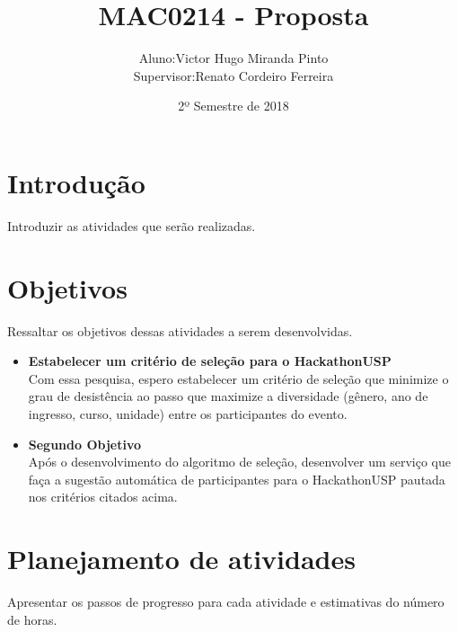\documentclass[10pt,twoside,a4paper]{article}
\title{MAC0214 - Proposta}
\author{
  \begin{tabular}{rl}
    Aluno:      & Victor Hugo Miranda Pinto \\
    Supervisor: & Renato Cordeiro Ferreira
  \end{tabular}
}
\date{2º Semestre de 2018}
\begin{document}
\maketitle

\section{Introdução}

  Introduzir as atividades que serão realizadas.


\section{Objetivos}

    Ressaltar os objetivos dessas atividades a serem desenvolvidas.

    \begin{itemize}
      \item \textbf{Estabelecer um critério de seleção para o  HackathonUSP}\\
        Com essa pesquisa, espero estabelecer um critério de seleção que minimize o grau de desistência ao passo que maximize a diversidade (gênero, ano de ingresso, curso, unidade) entre os participantes do evento.

      \item \textbf{Segundo Objetivo}\\
        Após o desenvolvimento do algoritmo de seleção, desenvolver um serviço que faça a sugestão automática de participantes para o HackathonUSP pautada nos critérios citados acima.
    \end{itemize}
    
\section{Planejamento de atividades}
  
  Apresentar os passos de progresso para cada atividade e estimativas do número de horas.
\end{document}
